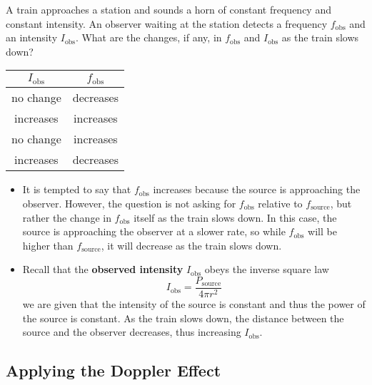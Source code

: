 \documentclass[a4paper,12pt]{article}
\begin{document}
A train approaches a station and sounds a horn of constant frequency and constant intensity. An observer waiting at the station detects a frequency $f_\text{obs}$ and an intensity $I_\text{obs}$. What are the changes, if any, in $f_\text{obs}$ and $I_\text{obs}$ as the train slows down?
\begin{table}[H]
  \centering
  \begin{tabular}{c | c}
    $I_\text{obs}$ & $f_\text{obs}$ \\
    \hline
    no change      & decreases      \\
    increases      & increases      \\
    no change      & increases      \\
    increases      & decreases
  \end{tabular}
\end{table}
\begin{itemize}
  \item It is tempted to say that $f_\text{obs}$ increases because the source is approaching the observer. However, the question is not asking for $f_\text{obs}$ relative to $f_\text{source}$, but rather the change in $f_\text{obs}$ itself as the train slows down. In this case, the source is approaching the observer at a slower rate, so while $f_\text{obs}$ will be higher than $f_\text{source}$, it will decrease as the train slows down.
  \item Recall that the \textbf{observed intensity} $I_\text{obs}$ obeys the inverse square law
        $$I_\text{obs} = \frac{P_\text{source}}{4\pi r^2}$$
        we are given that the intensity of the source is constant and thus the power of the source is constant. As the train slows down, the distance between the source and the observer decreases, thus increasing $I_\text{obs}$.
\end{itemize}

\pagebreak

\subsection{Applying the Doppler Effect}
\end{document}
